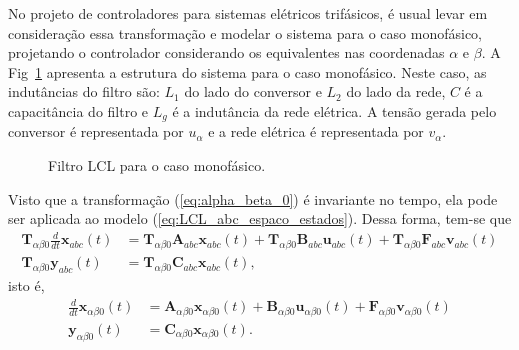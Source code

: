     No projeto de controladores para sistemas elétricos trifásicos, é usual levar em consideração essa transformação e modelar o sistema para o caso monofásico, projetando o controlador considerando os equivalentes nas coordenadas $\alpha$ e $\beta$. A Fig~\ref{fig:LCL_geral} apresenta a estrutura do sistema para o caso monofásico. Neste caso, as indutâncias do filtro são: $L_1$ do lado do conversor e $L_2$ do lado da rede, $C$ é a capacitância do filtro e $L_g$ é a indutância da rede elétrica. A tensão gerada pelo conversor é representada por $u_{\alpha}$ e a rede elétrica é representada por
    $v_{\alpha}$.

    \begin{figure}[htb]
        \centering{
            \def\svgwidth{\textwidth}
            }
        \renewcommand\figurename{Fig.}
        \caption{Filtro LCL para o caso monofásico.}
        \label{fig:LCL_geral}
    \end{figure}

    Visto que a transformação (\ref{eq:alpha_beta_0}) é invariante no tempo, ela pode ser aplicada ao modelo (\ref{eq:LCL_abc_espaco_estados}). Dessa forma, tem-se que
    \begin{equation}
        \begin{split}
            \mathbf{T}_{\alpha \beta 0} \frac{d}{dt} \mathbf{x}_{abc}(t) & =
                \mathbf{T}_{\alpha \beta 0} \mathbf{A}_{abc} \mathbf{x}_{abc}(t) +
                \mathbf{T}_{\alpha \beta 0} \mathbf{B}_{abc} \mathbf{u}_{abc}(t) +
                \mathbf{T}_{\alpha \beta 0} \mathbf{F}_{abc} \mathbf{v}_{abc}(t) \\
            \mathbf{T}_{\alpha \beta 0} \mathbf{y}_{abc}(t)
            & =
                \mathbf{T}_{\alpha \beta 0} \mathbf{C}_{abc} \mathbf{x}_{abc}(t) \text{,}
        \end{split}
    \end{equation}
    isto é,
    \begin{equation}
        \begin{split}
            \frac{d}{dt} \mathbf{x}_{\alpha \beta 0}(t) & =
                \mathbf{A}_{\alpha \beta 0} \mathbf{x}_{\alpha \beta 0}(t) +
                \mathbf{B}_{\alpha \beta 0} \mathbf{u}_{\alpha \beta 0}(t) +
                \mathbf{F}_{\alpha \beta 0} \mathbf{v}_{\alpha \beta 0}(t) \\
            \mathbf{y}_{\alpha \beta 0}(t) & = \mathbf{C}_{\alpha \beta 0}
                \mathbf{x}_{\alpha \beta 0}(t) \text{.}
        \end{split}
        \label{eq:LCL_ab0_espaco_estados}
    \end{equation}

